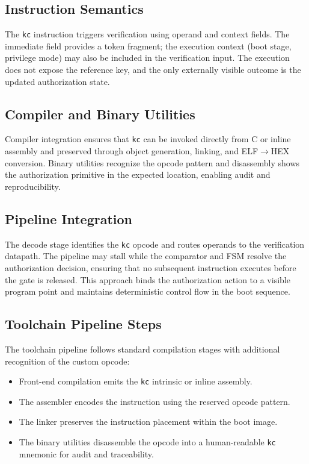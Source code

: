 \subsection{Instruction Semantics}
The \texttt{kc} instruction triggers verification using operand and context fields. The
immediate field provides a token fragment; the execution context (boot stage, privilege
mode) may also be included in the verification input. The execution does not expose the
reference key, and the only externally visible outcome is the updated authorization state.

\subsection{Compiler and Binary Utilities}
Compiler integration ensures that \texttt{kc} can be invoked directly from C or inline
assembly and preserved through object generation, linking, and ELF$\rightarrow$HEX
conversion. Binary utilities recognize the opcode pattern and disassembly shows the
authorization primitive in the expected location, enabling audit and reproducibility.

\subsection{Pipeline Integration}
The decode stage identifies the \texttt{kc} opcode and routes operands to the verification
datapath. The pipeline may stall while the comparator and FSM resolve the authorization
decision, ensuring that no subsequent instruction executes before the gate is released.
This approach binds the authorization action to a visible program point and maintains
deterministic control flow in the boot sequence.

\subsection{Toolchain Pipeline Steps}
The toolchain pipeline follows standard compilation stages with additional recognition of
the custom opcode:
\begin{itemize}
  \item Front-end compilation emits the \texttt{kc} intrinsic or inline assembly.
  \item The assembler encodes the instruction using the reserved opcode pattern.
  \item The linker preserves the instruction placement within the boot image.
  \item The binary utilities disassemble the opcode into a human-readable \texttt{kc}
        mnemonic for audit and traceability.
\end{itemize}

